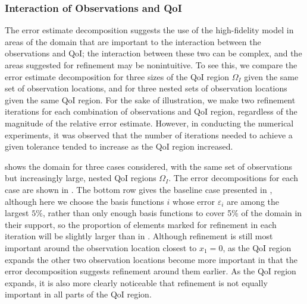 \documentclass[review,sort&compress]{elsarticle}
\theoremstyle{plain} %
\theoremstyle{definition} %
\begin{document}
\subsubsection{Interaction of Observations and QoI} \label{sec:qoivdata}
%
The error estimate decomposition suggests the use of the high-fidelity model in areas of the domain that are important to the interaction between the observations and QoI; the interaction between these two can be complex, and the areas suggested for refinement may be nonintuitive. To see this, we compare the error estimate decomposition for three sizes of the QoI region $\Omega_I$ given the same set of observation locations, and for three nested sets of observation locations given the same QoI region. For the sake of illustration, we make two refinement iterations for each combination of observations and QoI region, regardless of the magnitude of the relative error estimate. However, in conducting the numerical experiments, it was observed that the number of iterations needed to achieve a given tolerance tended to increase as the QoI region increased.

 shows the domain for three cases considered, with the same set of observations but increasingly large, nested QoI regions $\Omega_I$.
The error decompositions for each case are shown in . The bottom row gives the baseline case presented in , although here we choose the basis functions $i$ whose error $\varepsilon_i$ are among the largest $5\%$, rather than only enough basis functions to cover 5\% of the domain in their support, so the proportion of elements marked for refinement in each iteration will be slightly larger than in . Although refinement is still most important around the observation location closest to $x_1=0$, as the QoI region expands the other two observation locations become more important in that the error decomposition suggests refinement around them earlier. As the QoI region expands, it is also more clearly noticeable that refinement is not equally important in all parts of the QoI region.
\end{document}
